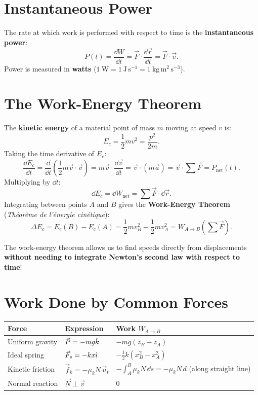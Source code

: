 \section{Instantaneous Power}

The rate at which work is performed with respect to time is the \textbf{instantaneous power}:
\[
\boxed{P(t) = \frac{\dd W}{\dd t} = \vec{F}\cdot\frac{\dd\vec{r}}{\dd t} = \vec{F}\cdot\vec{v}.}
\]
Power is measured in \textbf{watts} ($1\ \mathrm{W} = 1\ \mathrm{J\,s^{-1}} = 1\ \mathrm{kg\,m^2\,s^{-3}}$).

\section{The Work-Energy Theorem}

The \textbf{kinetic energy} of a material point of mass $m$ moving at speed $v$ is:
\[
\boxed{E_c = \frac{1}{2}m v^2 = \frac{p^2}{2m}.}
\]
Taking the time derivative of $E_c$:
\[
\frac{\dd E_c}{\dd t} = \frac{\dd}{\dd t}\left(\frac{1}{2}m\vec{v}\cdot\vec{v}\right) = m\vec{v}\cdot\frac{\dd\vec{v}}{\dd t} = \vec{v}\cdot(m\vec{a}) = \vec{v}\cdot\sum\vec{F} = P_{\text{net}}(t).
\]
Multiplying by $\dd t$:
\[
\dd E_c = \dd W_{\text{net}} = \sum\vec{F}\cdot\dd\vec{r}.
\]
Integrating between points $A$ and $B$ gives the \textbf{Work-Energy Theorem} (\emph{Théorème de l'énergie cinétique}):
\[
\boxed{\Delta E_c = E_c(B) - E_c(A) = \frac{1}{2}m v_B^2 - \frac{1}{2}m v_A^2 = W_{A\to B}\left(\sum\vec{F}\right).}
\]
\begin{keyidea}
The work-energy theorem allows us to find speeds directly from displacements \textbf{without needing to integrate Newton's second law with respect to time}!
\end{keyidea}

\section{Work Done by Common Forces}

\begin{center}
\renewcommand{\arraystretch}{1.3}
\begin{tabular}{@{}lll@{}}
\toprule
\textbf{Force} & \textbf{Expression} & \textbf{Work $W_{A\to B}$} \\
\midrule
Uniform gravity & $\vec{P} = -mg\hat{k}$ & $-mg(z_B - z_A)$ \\
Ideal spring & $\vec{F}_s = -k x\hat{\imath}$ & $-\frac{1}{2}k(x_B^2 - x_A^2)$ \\
Kinetic friction & $\vec{f}_k = -\mu_k N\,\vec{u}_t$ & $-\int_A^B \mu_k N\,\dd s = -\mu_k N\,d$ (along straight line) \\
Normal reaction & $\vec{N}\perp\vec{v}$ & $0$ \\
\bottomrule
\end{tabular}
\end{center}

